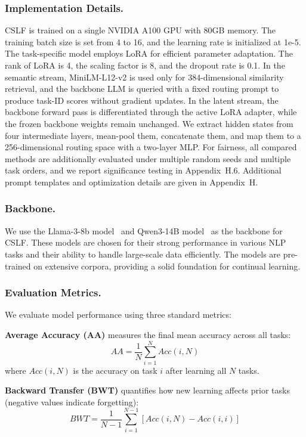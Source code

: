 \documentclass[11pt]{article}
\begin{document}
\subsubsection{Implementation Details.}  CSLF is trained on a single NVIDIA A100 GPU with 80GB memory. The training batch size is set from 4 to 16, and the learning rate is initialized at 1e-5. The task-specific model employs LoRA for efficient parameter adaptation. The rank of LoRA is 4, the scaling factor is 8, and the dropout rate is 0.1. In the semantic stream, MiniLM-L12-v2 is used only for 384-dimensional similarity retrieval, and the backbone LLM is queried with a fixed routing prompt to produce task-ID scores without gradient updates. In the latent stream, the backbone forward pass is differentiated through the active LoRA adapter, while the frozen backbone weights remain unchanged. We extract hidden states from four intermediate layers, mean-pool them, concatenate them, and map them to a 256-dimensional routing space with a two-layer MLP. For fairness, all compared methods are additionally evaluated under multiple random seeds and multiple task orders, and we report significance testing in Appendix~H.6. Additional prompt templates and optimization details are given in Appendix~H.



\subsubsection{Backbone.} We use the Llama-3-8b model~\cite{grattafiori2024llama3herdmodels} and Qwen3-14B model~\cite{qwen3} as the backbone for CSLF. These models are chosen for their strong performance in various NLP tasks and their ability to handle large-scale data efficiently. The models are pre-trained on extensive corpora, providing a solid foundation for continual learning.

\subsubsection{Evaluation Metrics.} We evaluate model performance using three standard metrics:

\textbf{Average Accuracy (AA)} measures the final mean accuracy across all tasks:
\begin{equation}
    AA = \frac{1}{N} \sum_{i=1}^{N} Acc(i, N)
\end{equation}
where $Acc(i, N)$ is the accuracy on task $i$ after learning all $N$ tasks.

\textbf{Backward Transfer (BWT)} quantifies how new learning affects prior tasks (negative values indicate forgetting):
\begin{equation}
    BWT = \frac{1}{N-1} \sum_{i=1}^{N-1} \left[ Acc(i, N) - Acc(i, i) \right]
\end{equation}
\end{document}
